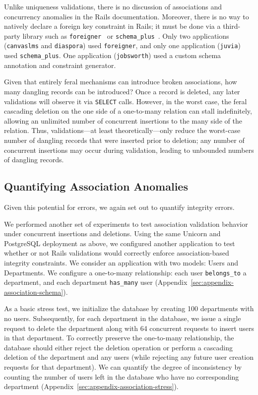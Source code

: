 Unlike uniqueness validations, there is no discussion of associations
and concurrency anomalies in the Rails documentation. Moreover, there
is no way to natively declare a foreign key constraint in Rails; it
must be done via a third-party library such as
\texttt{foreigner}~\cite{foreigner} or
\texttt{schema\_plus}~\cite{schemaplus}. Only two applications
(\texttt{canvaslms} and \texttt{diaspora}) used \texttt{foreigner},
and only one application (\texttt{juvia}) used \texttt{schema\_plus}. One
application (\texttt{jobsworth}) used a custom schema annotation and
constraint generator.

 Given that entirely
feral mechanisms can introduce broken associations, how many dangling
records can be introduced? Once a record is deleted, any later
validations will observe it via \texttt{SELECT} calls. However, in the
worst case, the feral cascading deletion on the one side of a
one-to-many relation can stall indefinitely, allowing an unlimited
number of concurrent insertions to the many side of the
relation. Thus, validations---at least theoretically---only reduce the
worst-case number of dangling records that were inserted prior to
deletion; any number of concurrent insertions may occur during
validation, leading to unbounded numbers of dangling records.

\subsection{Quantifying Association Anomalies}

Given this potential for errors, we again set out to quantify
integrity errors. 

We performed another set of experiments to test association validation
behavior under concurrent insertions and deletions. Using the same
Unicorn and PostgreSQL deployment as above, we configured another
application to test whether or not Rails validations would correctly
enforce association-based integrity constraints. We consider an
application with two models: Users and Departments. We configure a
one-to-many relationship: each user \texttt{belongs\_to} a department,
and each department \texttt{has\_many} user
(Appendix~\ref{sec:appendix-association-schema}).

As a basic stress test, we initialize the database by creating 100
departments with no users. Subsequently, for each department in the
database, we issue a single request to delete the department along
with 64 concurrent requests to insert users in that department. To
correctly preserve the one-to-many relationship, the database should
either reject the deletion operation or perform a cascading deletion
of the department and any users (while rejecting any future user
creation requests for that department). We can quantify the degree of
inconsistency by counting the number of users left in the database who
have no corresponding department (Appendix~\ref{sec:appendix-association-stress}).

